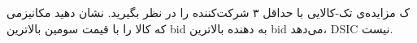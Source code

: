 ک مزایده‌ی تک-کالایی با حداقل ۳ شرکت‌کننده را در نظر بگیرید. نشان دهید مکانیزمی که کالا را با قیمت سومین بالاترین bid به دهنده بالاترین bid می‌دهد، DSIC نیست.